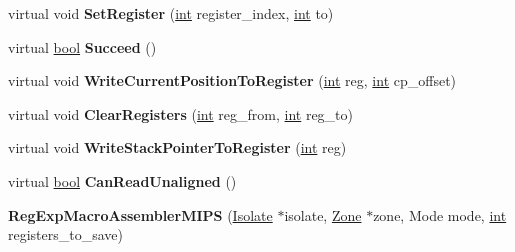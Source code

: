 \begin{DoxyCompactItemize}
virtual void {\bfseries Set\+Register} (\mbox{\hyperlink{classint}{int}} register\+\_\+index, \mbox{\hyperlink{classint}{int}} to)
\item 
\mbox{\label{classv8_1_1internal_1_1RegExpMacroAssemblerMIPS_a46808edf5f7a5f7ba71b8caedb66aa0a}} 
virtual \mbox{\hyperlink{classbool}{bool}} {\bfseries Succeed} ()
\item 
\mbox{\label{classv8_1_1internal_1_1RegExpMacroAssemblerMIPS_af342e57819b985ea254b8bcd994505e0}} 
virtual void {\bfseries Write\+Current\+Position\+To\+Register} (\mbox{\hyperlink{classint}{int}} reg, \mbox{\hyperlink{classint}{int}} cp\+\_\+offset)
\item 
\mbox{\label{classv8_1_1internal_1_1RegExpMacroAssemblerMIPS_ab12457b77455544117c217d04628a2d4}} 
virtual void {\bfseries Clear\+Registers} (\mbox{\hyperlink{classint}{int}} reg\+\_\+from, \mbox{\hyperlink{classint}{int}} reg\+\_\+to)
\item 
\mbox{\label{classv8_1_1internal_1_1RegExpMacroAssemblerMIPS_a842cf0974df70e03bbfeef991faa5840}} 
virtual void {\bfseries Write\+Stack\+Pointer\+To\+Register} (\mbox{\hyperlink{classint}{int}} reg)
\item 
\mbox{\label{classv8_1_1internal_1_1RegExpMacroAssemblerMIPS_adc3f178837a4dedd136bb43cbdebc165}} 
virtual \mbox{\hyperlink{classbool}{bool}} {\bfseries Can\+Read\+Unaligned} ()
\item 
\mbox{\label{classv8_1_1internal_1_1RegExpMacroAssemblerMIPS_aa6806a1e3af86ec20cc1077c01607b24}} 
{\bfseries Reg\+Exp\+Macro\+Assembler\+M\+I\+PS} (\mbox{\hyperlink{classv8_1_1internal_1_1Isolate}{Isolate}} $\ast$isolate, \mbox{\hyperlink{classv8_1_1internal_1_1Zone}{Zone}} $\ast$zone, Mode mode, \mbox{\hyperlink{classint}{int}} registers\+\_\+to\+\_\+save)
\item 
\mbox{\label{classv8_1_1internal_1_1RegExpMacroAssemblerMIPS_ade29d0ccd6722e1078ec888188917f9d}} 

\end{DoxyCompactItemize}
